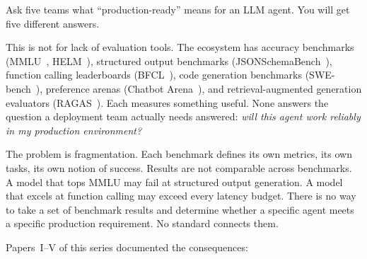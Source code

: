 \documentclass[11pt]{article}
\begin{document}
Ask five teams what ``production-ready'' means for an LLM agent. You will get five different answers.

This is not for lack of evaluation tools. The ecosystem has accuracy benchmarks (MMLU~\citep{hendrycks2021mmlu}, HELM~\citep{liang2023helm}), structured output benchmarks (JSONSchemaBench~\citep{geng2025jsonschemabench}), function calling leaderboards (BFCL~\citep{berkeley2024bfcl}), code generation benchmarks (SWE-bench~\citep{princeton2024swe}), preference arenas (Chatbot Arena~\citep{chiang2024chatbot}), and retrieval-augmented generation evaluators (RAGAS~\citep{es2023ragas}). Each measures something useful. None answers the question a deployment team actually needs answered: \emph{will this agent work reliably in my production environment?}

The problem is fragmentation. Each benchmark defines its own metrics, its own tasks, its own notion of success. Results are not comparable across benchmarks. A model that tops MMLU may fail at structured output generation. A model that excels at function calling may exceed every latency budget. There is no way to take a set of benchmark results and determine whether a specific agent meets a specific production requirement. No standard connects them.

Papers~I--V of this series documented the consequences:
\end{document}
